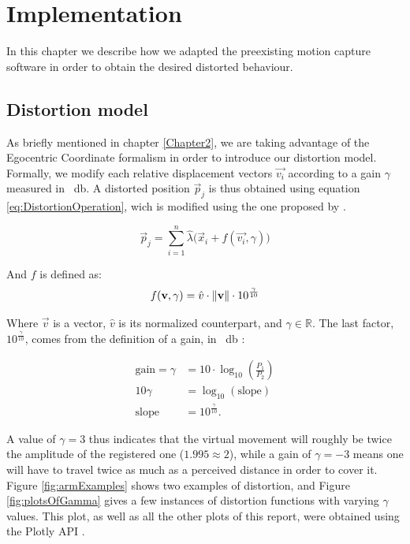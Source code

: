 
\chapter{Implementation} %

\label{Chapter3} %

In this chapter we describe how we adapted the preexisting motion capture software in order to obtain the desired distorted behaviour.

\section{Distortion model}

As briefly mentioned in chapter \ref{Chapter2}, we are taking advantage of the Egocentric Coordinate formalism in order to introduce our distortion model. Formally, we modify each relative displacement vectors $\vec{v_i}$ according to a gain $\gamma$ measured in \SI{}{\decibel}. A distorted position $\vec{p}_j$ is thus obtained using equation \ref{eq:DistortionOperation}, wich is modified using the one proposed by \cite{molla2017egocentric}.

\begin{equation}
\label{eq:DistortionOperation}
\vec{p}_j = \displaystyle\sum_{i=1}^{n} \hat{\lambda}\big(\vec{x}_i + f(\vec{v_i},\gamma )\big)
\end{equation}

\noindent
And $f$ is defined as:
\begin{equation}
\label{eq:DistortionFunction}
f(\mathbf{v},\gamma ) = \hat{v} \cdot \lVert\mathbf{v}\rVert \cdot 10^{\frac{\gamma}{10}}
\end{equation}

\noindent
Where $\vec{v}$ is a vector, $\hat{v}$ is its normalized counterpart, and $\gamma \in \mathbb{R}$. The last factor, $10^{\frac{\gamma}{10}}$, comes from the definition of a gain, in \SI{}{\decibel} \cite{book:decibel}:

\begin{align*}
    \text{gain} = \gamma &= 10 \cdot \log_{10} (\frac{P_1}{P_2})\\
    10\gamma &= \log_{10} (\text{slope})\\
    \text{slope} &= 10^{\frac{\gamma}{10}}.
\end{align*}

\noindent
A value of $\gamma = 3$ thus indicates that the virtual movement will roughly be twice the amplitude of the registered one ($1.995 \approx 2$), while a gain of $\gamma = -3$ means one will have to travel twice as much as a perceived distance in order to cover it. Figure \ref{fig:armExamples} shows two examples of distortion, and Figure \ref{fig:plotsOfGamma} gives a few instances of distortion functions with varying $\gamma $ values. This plot, as well as all the other plots of this report, were obtained using the Plotly API \cite{plotly}.

